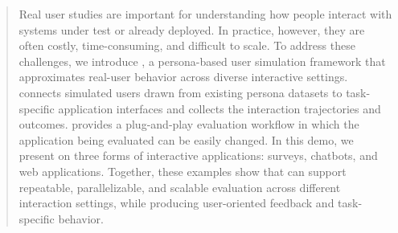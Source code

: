 \begin{abstract} 
Real user studies are important for understanding how people interact with systems under test or already deployed. In practice, however, they are often costly, time-consuming, and difficult to scale. To address these challenges, we introduce \method, a persona-based user simulation framework that approximates real-user behavior across diverse interactive settings. \method connects simulated users drawn from existing persona datasets to task-specific application interfaces and collects the interaction trajectories and outcomes. 
\method  provides a plug-and-play evaluation workflow in which the application being evaluated can be easily changed. In this demo, we present \method on three forms of interactive applications: surveys, 
chatbots, 
and web applications.
Together, these examples show that \method can support repeatable, parallelizable, and scalable evaluation across different interaction settings, while producing user-oriented feedback and task-specific behavior.
\end{abstract}

